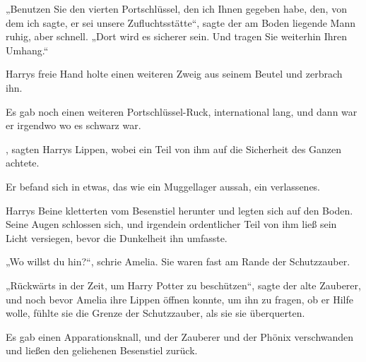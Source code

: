 „Benutzen Sie den vierten Portschlüssel, den ich Ihnen gegeben habe, den, von dem ich sagte, er sei unsere Zufluchtsstätte“, sagte der am Boden liegende Mann ruhig, aber schnell. „Dort wird es sicherer sein. Und tragen Sie weiterhin Ihren Umhang.“

Harrys freie Hand holte einen weiteren Zweig aus seinem Beutel und zerbrach ihn.

Es gab noch einen weiteren Portschlüssel-Ruck, international lang, und dann war er irgendwo wo es schwarz war.

, sagten Harrys Lippen, wobei ein Teil von ihm auf die Sicherheit des Ganzen achtete.

Er befand sich in etwas, das wie ein Muggellager aussah, ein verlassenes.

Harrys Beine kletterten vom Besenstiel herunter und legten sich auf den Boden. Seine Augen schlossen sich, und irgendein ordentlicher Teil von ihm ließ sein Licht versiegen, bevor die Dunkelheit ihn umfasste.

\later

„Wo willst du hin?“, schrie Amelia. Sie waren fast am Rande der Schutzzauber.

„Rückwärts in der Zeit, um Harry Potter zu beschützen“, sagte der alte Zauberer, und noch bevor Amelia ihre Lippen öffnen konnte, um ihn zu fragen, ob er Hilfe wolle, fühlte sie die Grenze der Schutzzauber, als sie sie überquerten.

Es gab einen Apparationsknall, und der Zauberer und der Phönix verschwanden und ließen den geliehenen Besenstiel zurück.

